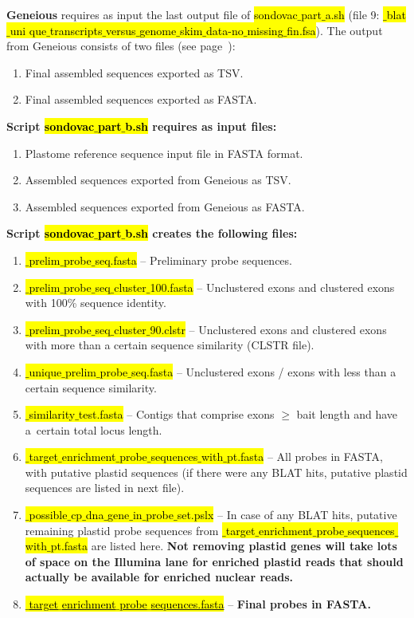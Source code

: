 \documentclass[a4paper, 11pt, twoside]{article}
\renewcommand{\texttt}[1]{\hl{\ttfamily #1}}
\begin{document}
\textbf{Geneious} requires as input the last output file of \texttt{sondovac$\_$part$\_$a.sh} (file 9: \texttt{*$\_$blat$\_$uni\- que$\_$transcripts$\_$versus$\_$genome$\_$skim$\_$data-no$\_$missing$\_$fin.fsa}). The output from Gene\-ious consists of two files (see page~\pageref{geneious-usage}):

\begin{enumerate}
  \item Final assembled sequences exported as TSV.
  \item Final assembled sequences exported as FASTA.
\end{enumerate}

\textbf{Script \texttt{sondovac$\_$part$\_$b.sh} requires as input files:}

\begin{enumerate}
  \item Plastome reference sequence input file in FASTA format.
  \item Assembled sequences exported from Geneious as TSV.
  \item Assembled sequences exported from Geneious as FASTA.
\end{enumerate}

\textbf{Script \texttt{sondovac$\_$part$\_$b.sh} creates the following files:}

\begin{enumerate}
  \item \texttt{*$\_$prelim$\_$probe$\_$seq.fasta} -- Preliminary probe sequences.
  \item \texttt{*$\_$prelim$\_$probe$\_$seq$\_$cluster$\_$100.fasta} -- Unclustered exons and clustered exons with 100\% sequence identity.
  \item \texttt{*$\_$prelim$\_$probe$\_$seq$\_$cluster$\_$90.clstr} -- Unclustered exons and clustered exons with more than a certain sequence similarity (CLSTR file).
  \item \texttt{*$\_$unique$\_$prelim$\_$probe$\_$seq.fasta} -- Unclustered exons / exons with less than a certain sequence similarity.
  \item \texttt{*$\_$similarity$\_$test.fasta} -- Contigs that comprise exons $\geq$ bait length and have a~certain total locus length.
  \item \texttt{*$\_$target$\_$enrichment$\_$probe$\_$sequences$\_$with$\_$pt.fasta} -- All probes in FASTA, with putative plastid sequences (if there were any BLAT hits, putative plastid sequences are listed in next file).
  \item \texttt{*$\_$possible$\_$cp$\_$dna$\_$gene$\_$in$\_$probe$\_$set.pslx} -- In case of any BLAT hits, putative remaining plastid probe sequences from \texttt{*$\_$target$\_$enrichm\-ent$\_$probe$\_$sequences$\_$with$\_$pt\-.fasta} are listed here. \textbf{Not removing plastid genes will take lots of space on the Illumina lane for enriched plastid reads that should actually be available for enriched nuclear reads.}
  \item \underline{\texttt{*$\_$target$\_$enrichment$\_$probe$\_$sequences.fasta}} -- \textbf{Final probes in FASTA.}
\end{enumerate}
\end{document}
